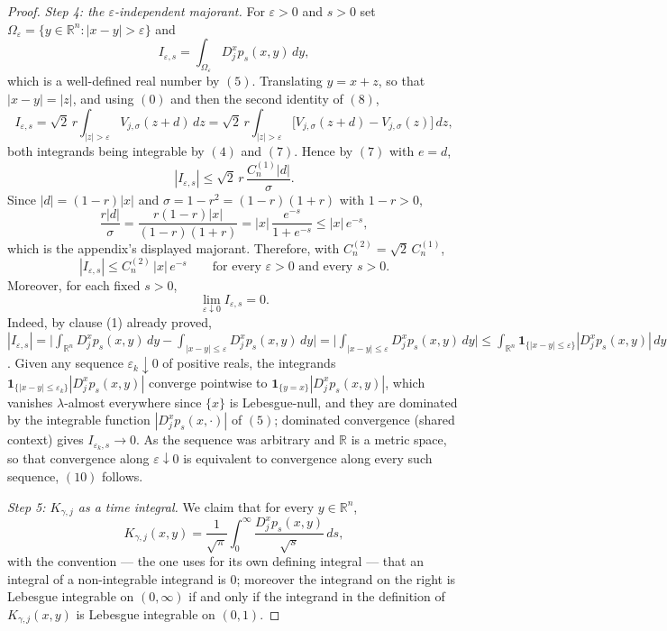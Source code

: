 \begin{proof}
\emph{Step 4: the $\varepsilon$-independent majorant.}
For $\varepsilon > 0$ and $s > 0$ set
$\Omega_\varepsilon = \{y \in \mathbb{R}^n : |x-y| > \varepsilon\}$ and
\[
  I_{\varepsilon,s} = \int_{\Omega_\varepsilon} D_j^xp_s(x,y)\,dy ,
\]
which is a well-defined real number by $(5)$.  Translating $y = x+z$, so that
$|x-y| = |z|$, and using $(0)$ and then the second identity of $(8)$,
\[
  I_{\varepsilon,s}
    = \sqrt2\,r\int_{|z|>\varepsilon}V_{j,\sigma}(z+d)\,dz
    = \sqrt2\,r\int_{|z|>\varepsilon}
        \bigl[V_{j,\sigma}(z+d)-V_{j,\sigma}(z)\bigr]\,dz ,
\]
both integrands being integrable by $(4)$ and $(7)$.  Hence by $(7)$ with
$e = d$,
\[
  |I_{\varepsilon,s}| \leq \sqrt2\,r\,\frac{C^{(1)}_n|d|}{\sigma} .
\]
Since $|d| = (1-r)|x|$ and $\sigma = 1-r^2 = (1-r)(1+r)$ with $1-r > 0$,
\[
  \frac{r|d|}{\sigma} = \frac{r(1-r)|x|}{(1-r)(1+r)}
    = |x|\,\frac{e^{-s}}{1+e^{-s}} \leq |x|\,e^{-s} ,
\]
which is the appendix's displayed majorant.  Therefore, with
$C^{(2)}_n = \sqrt2\,C^{(1)}_n$,
\begin{equation*}
  |I_{\varepsilon,s}| \leq C^{(2)}_n\,|x|\,e^{-s}
  \qquad\text{for every }\varepsilon>0\text{ and every }s>0 . \tag{9}
\end{equation*}
Moreover, for each fixed $s > 0$,
\begin{equation*}
  \lim_{\varepsilon\downarrow0} I_{\varepsilon,s} = 0 . \tag{10}
\end{equation*}
Indeed, by clause (1) already proved,
$|I_{\varepsilon,s}| = \bigl|\int_{\mathbb{R}^n}D_j^xp_s(x,y)\,dy
 - \int_{|x-y|\leq\varepsilon}D_j^xp_s(x,y)\,dy\bigr|
 = \bigl|\int_{|x-y|\leq\varepsilon}D_j^xp_s(x,y)\,dy\bigr|
 \leq \int_{\mathbb{R}^n}\mathbf 1_{\{|x-y|\leq\varepsilon\}}
   |D_j^xp_s(x,y)|\,dy$.
Given any sequence $\varepsilon_k \downarrow 0$ of positive reals, the
integrands $\mathbf 1_{\{|x-y|\leq\varepsilon_k\}}|D_j^xp_s(x,y)|$ converge
pointwise to $\mathbf 1_{\{y = x\}}|D_j^xp_s(x,y)|$, which vanishes
$\lambda$-almost everywhere since $\{x\}$ is Lebesgue-null, and they are
dominated by the integrable function $|D_j^xp_s(x,\cdot)|$ of $(5)$; dominated
convergence (shared context) gives $I_{\varepsilon_k,s} \to 0$.  As the sequence
was arbitrary and $\mathbb{R}$ is a metric space, so that convergence along
$\varepsilon \downarrow 0$ is equivalent to convergence along every such
sequence, $(10)$ follows.

\emph{Step 5: $K_{\gamma,j}$ as a time integral.}
We claim that for every $y \in \mathbb{R}^n$,
\begin{equation*}
  K_{\gamma,j}(x,y)
    = \frac{1}{\sqrt\pi}\int_0^\infty \frac{D_j^xp_s(x,y)}{\sqrt s}\,ds ,
  \tag{11}
\end{equation*}
with the convention --- the one  uses for its own
defining integral --- that an integral of a non-integrable integrand is $0$;
moreover the integrand on the right is Lebesgue integrable on $(0,\infty)$ if
and only if the integrand in the definition of $K_{\gamma,j}(x,y)$ is Lebesgue
integrable on $(0,1)$.


\end{proof}
